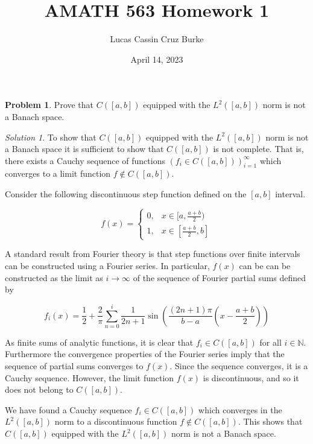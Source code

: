 \documentclass[12pt,a4paper]{article}
\title{AMATH 563 Homework 1}
\author{Lucas Cassin Cruz Burke}
\date{April 14, 2023}
\theoremstyle{definition}
\newtheorem{problem}{Problem}
\theoremstyle{remark}
\newtheorem*{solution}{Solution}
\begin{document}
\maketitle

\begin{problem}
    Prove that $C([a,b])$ equipped with the $L^2([a,b])$ norm is not a Banach space.
\end{problem}
\begin{solution}
    To show that $C([a,b])$ equipped with the $L^2([a,b])$ norm is not a Banach space it is sufficient to show that $C([a,b])$ is not complete. That is, there exists a Cauchy sequence of functions $(f_i \in C([a,b]))_{i=1}^\infty$ which converges to a limit function $f \notin C([a,b])$. 

    Consider the following discontinuous step function defined on the $[a,b]$ interval.

    $$f(x) = \begin{cases} 0, & x \in [a, \frac{a+b}{2}) \\ 1, & x \in [\frac{a+b}{2}, b] \end{cases}$$

    A standard result from Fourier theory is that step functions over finite intervals can be constructed using a Fourier series. In particular, $f(x)$ can be can be constructed as the limit as $i \rightarrow \infty$ of the sequence of Fourier partial sums defined by

    $$f_i(x)= \frac{1}{2}+\frac{2}{\pi}\sum_{n=0}^{i}\frac{1}{2n+1}\sin\left(\frac{\left(2n+1\right)\pi}{b-a}\left(x-\frac{a+b}{2}\right)\right)$$

    As finite sums of analytic functions, it is clear that $f_i \in C([a,b])$ for all $i \in \mathbb N$. Furthermore the convergence properties of the Fourier series imply that the sequence of partial sums converges to $f(x)$. Since the sequence converges, it is a Cauchy sequence. However, the limit function $f(x)$ is discontinuous, and so it does not belong to $C([a,b])$. 

    We have found a Cauchy sequence $f_i \in C([a,b])$ which converges in the $L^2([a,b])$ norm to a discontinuous function $f \notin C([a,b])$. This shows that $C([a,b])$ equipped with the $L^2([a,b])$ norm is not a Banach space. 
\end{solution}
\end{document}
